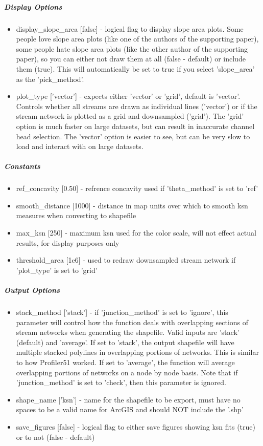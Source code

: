 \subparagraph{Display Options}
\begin{itemize}
\item display\_slope\_area [false] - logical flag to display slope area plots. Some people love slope area plots (like one of the authors of
the supporting paper), some people hate slope area plots (like the other author of the supporting paper), so you can either 
not draw them at all (false - default) or include them (true). This will automatically be set to true if you select 'slope\_area'
as the 'pick\_method'.
\item plot\_type ['vector'] - expects either 'vector' or 'grid', default is 'vector'. Controls whether all streams are drawn as individual 
lines ('vector') or if the stream network is plotted as a grid and downsampled ('grid'). The 'grid' option is much faster on 
large datasets, but can result in inaccurate channel head selection. The 'vector' option is easier to see, but can be very 
slow to load and interact with on large datasets.	
\end{itemize}

\subparagraph{Constants}
\begin{itemize}
\item ref\_concavity [0.50] - refrence concavity used if 'theta\_method' is set to 'ref'
\item smooth\_distance [1000] - distance in map units over which to smooth ksn measures when converting to shapefile
\item max\_ksn [250] - maximum  ksn used for the color scale, will not effect actual results, for display purposes only
\item threshold\_area [1e6] - used to redraw downsampled stream network if 'plot\_type' is set to 'grid' 
\end{itemize}

\subparagraph{Output Options}
\begin{itemize}
\item stack\_method ['stack'] - if 'junction\_method' is set to 'ignore', this parameter will control how the function deals with overlapping sections
of stream networks when generating the shapefile. Valid inputs are 'stack' (default) and 'average'. If set to 'stack', the output shapefile 
will have multiple stacked polylines in overlapping portions of networks. This is similar to how Profiler51 worked. If set to 'average', the
function will average overlapping portions of networks on a node by node basis. Note that if 'junction\_method' is set to 'check', then this 
parameter is ignored.
\item shape\_name ['ksn'] - name for the shapefile to be export, must have no spaces to be a valid name for ArcGIS and should NOT include the '.shp'
\item save\_figures [false] - logical flag to either save figures showing ksn fits (true) or to not (false - default)	
\end{itemize}

